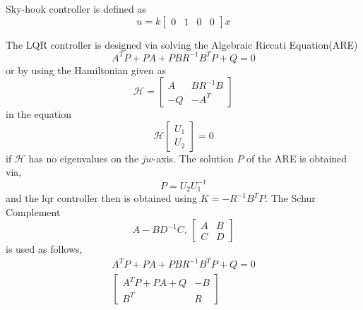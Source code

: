 Sky-hook controller is defined as 
\begin{equation}
    u=k\begin{bmatrix}0& 1& 0& 0\end{bmatrix}x
\end{equation}

The LQR controller is designed via solving the Algebraic Riccati Equation(ARE) 
\begin{equation}
    A^TP+PA+PBR^{-1}B^TP+Q=0
\end{equation}
or by using the Hamiltonian given as
\begin{equation}
    \mathcal{H}=\begin{bmatrix}
        A& BR^{-1}B\\
        -Q& -A^T
    \end{bmatrix}
\end{equation}
in the equation
\begin{equation}
    \mathcal{H}\begin{bmatrix}
        U_1\\U_2
    \end{bmatrix}=0
\end{equation}
if $\mathcal{H}$ has no eigenvalues on the $jw$-axis. The solution $P$ of the ARE is obtained via,
\begin{equation}
    P=U_2 U_1^{-1}
\end{equation}
and the lqr controller then is obtained using $K=-R^{-1}B^TP$. The Schur Complement 
\begin{equation}
    A-BD^{-1}C,\,
\begin{bmatrix}
    A& B\\C& D
\end{bmatrix}
\end{equation}
is used as follows,
\begin{equation}
\begin{split}
    A^TP+PA+PBR^{-1}B^TP+Q=0\\
    \begin{bmatrix}
        A^TP+PA+Q& -B\\
        B^T& R
    \end{bmatrix}
\end{split}
\end{equation}



